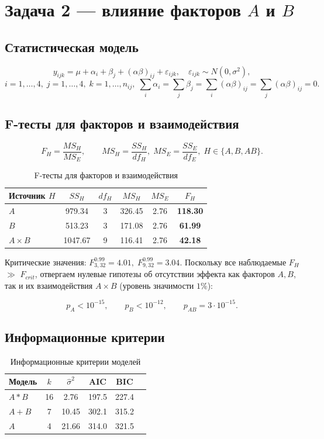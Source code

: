 \documentclass[areasetadvanced]{scrartcl}
\begin{document}
\section{Задача 2 — влияние факторов $A$ и $B$}
\subsection{Статистическая модель}
\[
y_{ijk}= \mu+\alpha_i+\beta_j+(\alpha\beta)_{ij}+\varepsilon_{ijk},
\quad
\varepsilon_{ijk}\sim N(0,\sigma^2),
\]
\[
i=1,\dots,4,\; j=1,\dots,4,\; k=1,\dots,n_{ij},\;
\sum_i\alpha_i=\sum_j\beta_j=\sum_i(\alpha\beta)_{ij}
               =\sum_j(\alpha\beta)_{ij}=0.
\]

\subsection{F-тесты для факторов и взаимодействия}
\[
F_H=\frac{MS_H}{MS_E},\qquad
MS_H=\frac{SS_H}{df_H},\;
MS_E=\frac{SS_E}{df_E},\;
H\in\{A,B,AB\}.
\]

\begin{table}[H]\centering
  \caption{F-тесты для факторов и взаимодействия}
\begin{tabular}{l|ccccc}
  \toprule
  Источник $H$ & $SS_H$ & $df_H$ & $MS_H$ & $MS_E$ & $F_H$\\
  \midrule
  $A$         & 979.34 & 3 & 326.45 & 2.76 & \textbf{118.30}\\
  $B$         & 513.23 & 3 & 171.08 & 2.76 & \textbf{61.99}\\
  $A\times B$ & 1047.67& 9 & 116.41 & 2.76 & \textbf{42.18}\\
  \bottomrule
  \end{tabular}
  \end{table}
  Критические значения: \(F_{3,32}^{0.99}=4.01,\;
  F_{9,32}^{0.99}=3.04\).
  Поскольку все наблюдаемые \(F_H\) $\gg$ \(F_{crit}\),
  отвергаем нулевые гипотезы об отсутствии эффекта
  как факторов \(A,B\), так и их взаимодействия \(A\times B\)
  (уровень значимости \(1\%\)):
  
  \[
  p_A<10^{-15},\qquad
  p_B<10^{-12},\qquad
  p_{AB}=3\cdot10^{-15}.
  \]

\subsection{Информационные критерии}
\begin{table}[H]\centering
  \caption{Информационные критерии моделей}
  \begin{tabular}{l|ccccc}
  \toprule
  Модель & $k$ & $\hat\sigma^{2}$ & AIC & BIC\\
  \midrule
  $A*B$ & 16 & 2.76  & 197.5 & 227.4\\
  $A+B$ &  7 & 10.45 & 302.1 & 315.2\\
  $A$   &  4 & 21.66 & 314.0 & 321.5\\
  \bottomrule
  \end{tabular}
  \end{table}
  
\end{document}
